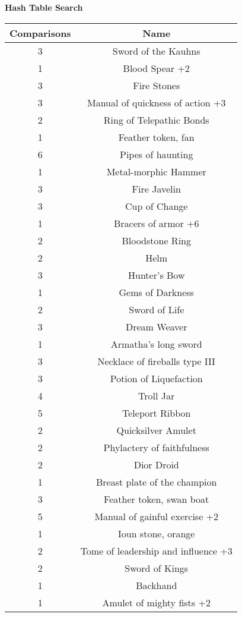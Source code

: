 \documentclass[letterpaper, 10pt]{article}
\begin{document}
\begin{center}
    \bf{Hash Table Search}\\
    \begin{tabular}{|| c c ||}
    \hline
    \bf{Comparisons} & \bf{Name} \\
    \hline
    3  & Sword of the Kauhns\\
    1  & Blood Spear +2\\
    3  & Fire Stones\\
    3  & Manual of quickness of action +3\\
    2  & Ring of Telepathic Bonds\\
    1  & Feather token, fan\\
    6  & Pipes of haunting\\
    1  & Metal-morphic Hammer\\
    3  & Fire Javelin\\
    3  & Cup of Change\\
    1  & Bracers of armor +6\\
    2  & Bloodstone Ring\\
    2  & Helm\\
    3  & Hunter's Bow\\
    1  & Gems of Darkness\\
    2  & Sword of Life\\
    3  & Dream Weaver\\
    1  & Armatha's long sword\\
    3  & Necklace of fireballs type III\\
    3  & Potion of Liquefaction\\
    4  & Troll Jar\\
    5  & Teleport Ribbon\\
    2  & Quicksilver Amulet\\
    2  & Phylactery of faithfulness\\
    2  & Dior Droid\\
    1  & Breast plate of the champion\\
    3  & Feather token, swan boat\\
    5  & Manual of gainful exercise +2\\
    1  & Ioun stone, orange\\
    2  & Tome of leadership and influence +3\\
    2  & Sword of Kings\\
    1  & Backhand\\
    1  & Amulet of mighty fists +2\\

\end{tabular}
\end{center}
\end{document}
